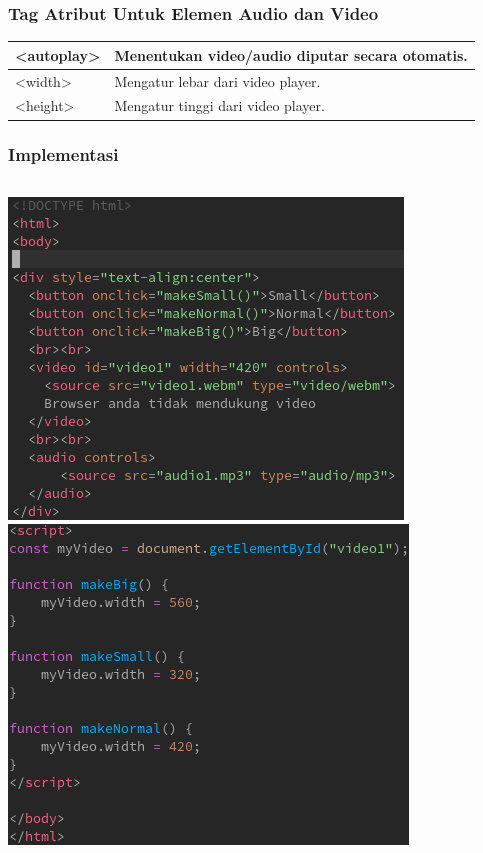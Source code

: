 \documentclass{beamer}
\begin{document}
\begin{frame}
    \frametitle{Tag Atribut Untuk Elemen Audio dan Video}
    \begin{table}[!ht]
        \begin{tabular}{|l|l|}
            \hline
            \textless{}autoplay\textgreater{} & Menentukan video/audio diputar secara otomatis. \\ \hline
            \textless{}width\textgreater{}    & Mengatur lebar dari video player.               \\ \hline
            \textless{}height\textgreater{}   & Mengatur tinggi dari video player.              \\ \hline
        \end{tabular}
    \end{table}
\end{frame}

\begin{frame}
    \frametitle{Implementasi}
    \begin{columns}
        \includegraphics[width=\linewidth]{1.png}
        \includegraphics[width=\linewidth]{2.png}
    \end{columns}
\end{frame}
\end{document}
